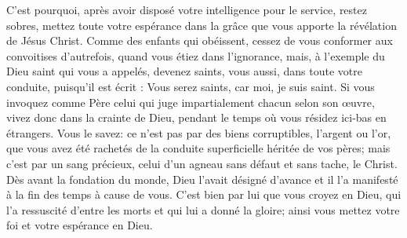 C’est pourquoi, après avoir disposé votre intelligence pour le service,
	restez sobres, mettez toute votre espérance dans la grâce
		que vous apporte la révélation de Jésus Christ.
Comme des enfants qui obéissent,
	cessez de vous conformer aux convoitises d’autrefois,
	quand vous étiez dans l’ignorance,
	mais, à l’exemple du Dieu saint qui vous a appelés,
	devenez saints, vous aussi, dans toute votre conduite,
	puisqu’il est écrit : Vous serez saints, car moi, je suis saint.
Si vous invoquez comme Père
		celui qui juge impartialement chacun selon son œuvre,
	vivez donc dans la crainte de Dieu,
	pendant le temps où vous résidez ici-bas en étrangers.
Vous le savez: ce n’est pas par des biens corruptibles, l’argent ou l’or,
	que vous avez été rachetés de la conduite superficielle
		héritée de vos pères;
	mais c’est par un sang précieux,
	celui d’un agneau sans défaut et sans tache, le Christ.
Dès avant la fondation du monde, Dieu l’avait désigné d’avance
	et il l’a manifesté à la fin des temps à cause de vous.
C’est bien par lui que vous croyez en Dieu,
	qui l’a ressuscité d’entre les morts et qui lui a donné la gloire;
	ainsi vous mettez votre foi et votre espérance en Dieu.
